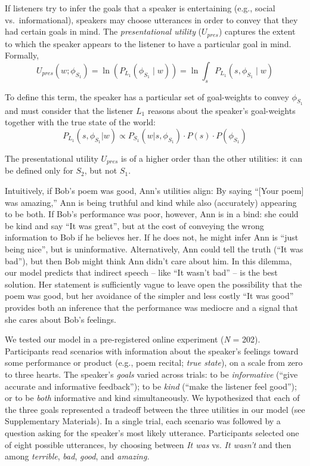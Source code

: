 \documentclass[12pt]{article}
\begin{document}
If listeners try to infer the goals that a speaker is entertaining
(e.g., social vs.~informational), speakers may choose utterances in
order to convey that they had certain goals in mind. The \emph{presentational utility}
(\(U_{pres}\)) captures the extent to which the speaker appears to the
listener to have a particular goal in mind. Formally,
\[U_{pres}(w; \phi_{S_{1}}) = \ln(P_{L_1}(\phi_{S_1} \mid w)) = \ln \int_s P_{L_1}(s, \phi_{S_1} \mid w)\]

\noindent To define this term, the speaker has a particular set of goal-weights to convey $\phi_{S_{1}}$ and must consider that the listener \(L_1\) reasons about the speaker's goal-weights together with the true state of the world:
\[P_{L_1}(s, \phi_{S_{1}}| w) \propto P_{S_1}(w | s, \phi_{S_{1}}) \cdot P(s) \cdot P(\phi_{S_{1}})\]

\noindent The presentational utility $U_{pres}$ is of a higher order than the other utilities: it can be defined only for \(S_2\), but not \(S_1\).

Intuitively, if Bob's poem was good, Ann's utilities align:
By saying \enquote{{[}Your poem{]} was amazing,}
Ann is being truthful and kind while also (accurately) appearing to be both.
If Bob's performance was poor, however, Ann is in a bind: she could be kind and say \enquote{It was great}, but at the cost of conveying the wrong information to Bob if he believes her. If he does not, he might infer Ann is \enquote{just being nice}, but is uninformative.
Alternatively, Ann could tell the truth (\enquote{It was bad}), but then
Bob might think Ann didn't care about him. In this dilemma, our model predicts that indirect speech -- like \enquote{It wasn't bad} -- is the best solution. Her statement is sufficiently vague to leave open the possibility that the poem was good, but her avoidance of the simpler and less costly \enquote{It was good} provides both an inference that the performance was mediocre and a signal that she cares about Bob's feelings.


We tested our model in a pre-registered online experiment (\emph{N} = 202).
Participants read scenarios with information about the speaker's
feelings toward some performance or product (e.g., poem recital;
\emph{true state}), on a scale from zero to three hearts. The speaker's \emph{goals} varied across trials: to be \emph{informative}
(\enquote{give accurate and informative feedback}); to be \emph{kind}
(\enquote{make the listener feel good}); or to be \emph{both}
informative and kind simultaneously. We hypothesized that each of the
three goals represented a tradeoff between the three utilities in our
model (see Supplementary Materials). In a single trial, each scenario
was followed by a question asking for the speaker's most likely utterance.
Participants selected one of eight possible utterances, by choosing
between \emph{It was} vs. \emph{It wasn't} and then among
\emph{terrible}, \emph{bad}, \emph{good}, and \emph{amazing.}
\end{document}
